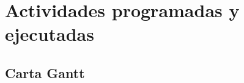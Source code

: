 \documentclass[]{article}
\begin{document}


\clearpage
\section{Actividades programadas y ejecutadas}

\subsection{Carta Gantt}
\end{document}
